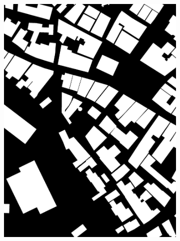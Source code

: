 \begin{figure}[htb]
\begin{subfigure}{0.19\textwidth}
  \includegraphics[width=1\linewidth]{fig/vai/5_osm.jpg}
\end{subfigure}
\begin{subfigure}{0.19\textwidth}
  \centering

\end{subfigure}
\end{figure}
